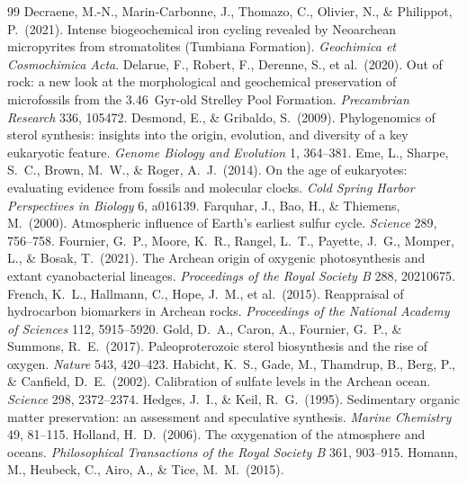 \documentclass[11pt]{article}
\begin{document}
\begin{thebibliography}{99}
 Decraene, M.-N., Marin-Carbonne, J., Thomazo, C.,
Olivier, N., \& Philippot, P.\ (2021). Intense biogeochemical iron cycling revealed by Neoarchean
micropyrites from stromatolites (Tumbiana Formation). \textit{Geochimica et Cosmochimica Acta}.
 Delarue, F., Robert, F., Derenne, S., et al.\ (2020). Out
of rock: a new look at the morphological and geochemical preservation of microfossils from the
3.46~Gyr-old Strelley Pool Formation. \textit{Precambrian Research} 336, 105472.
 Desmond, E., \& Gribaldo, S.\ (2009). Phylogenomics
of sterol synthesis: insights into the origin, evolution, and diversity of a key eukaryotic feature.
\textit{Genome Biology and Evolution} 1, 364--381.
 Eme, L., Sharpe, S.~C., Brown, M.~W., \& Roger, A.~J.\ (2014). On
the age of eukaryotes: evaluating evidence from fossils and molecular clocks. \textit{Cold Spring
Harbor Perspectives in Biology} 6, a016139.
 Farquhar, J., Bao, H., \& Thiemens, M.\ (2000).
Atmospheric influence of Earth's earliest sulfur cycle. \textit{Science} 289, 756--758.
 Fournier, G.~P., Moore, K.~R., Rangel, L.~T., Payette,
J.~G., Momper, L., \& Bosak, T.\ (2021). The Archean origin of oxygenic photosynthesis and extant
cyanobacterial lineages. \textit{Proceedings of the Royal Society B} 288, 20210675.
 French, K.~L., Hallmann, C., Hope, J.~M., et al.\ (2015).
Reappraisal of hydrocarbon biomarkers in Archean rocks. \textit{Proceedings of the National Academy
of Sciences} 112, 5915--5920.
 Gold, D.~A., Caron, A., Fournier, G.~P., \& Summons, R.~E.\
(2017). Paleoproterozoic sterol biosynthesis and the rise of oxygen. \textit{Nature} 543, 420--423.
\bibitem[Habicht et al.(2002)]{Habicht2002} Habicht, K.~S., Gade, M., Thamdrup, B., Berg, P., \&
Canfield, D.~E.\ (2002). Calibration of sulfate levels in the Archean ocean. \textit{Science} 298,
2372--2374.
 Hedges, J.~I., \& Keil, R.~G.\ (1995). Sedimentary organic
matter preservation: an assessment and speculative synthesis. \textit{Marine Chemistry} 49, 81--115.
\bibitem[Holland(2006)]{Holland2006} Holland, H.~D.\ (2006). The oxygenation of the atmosphere and
oceans. \textit{Philosophical Transactions of the Royal Society B} 361, 903--915.
\bibitem[Homann et al.(2015)]{Homann2015} Homann, M., Heubeck, C., Airo, A., \& Tice, M.~M.\ (2015).

\end{thebibliography}
\end{document}
